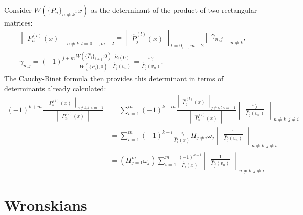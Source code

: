 \documentclass{book}
\begin{document}
Consider $W(\{P_n\}_{n \neq k} ; x)$ as the determinant of the product of two rectangular matrices:
\begin{align*}
\begin{bmatrix} P_n^{(l)}(x) \end{bmatrix}_{n \neq k, l = 0,...,m-2} = 
\begin{bmatrix} \hat{P}_j^{(l)}(x) \end{bmatrix}_{l=0,...,m-2}
\begin{bmatrix} \gamma_{n,j} \end{bmatrix}_{n \neq k}, \\
\gamma_{n,j} = (-1)^{j+m} \frac{ W(\{\hat{P}_i\}_{i \neq j} ; 0) }{ W(\{ \hat{P}_i \} ; 0) } \frac{\hat{P}_j(0)}{\hat{P}_j(v_n)} = \frac{\omega_j}{\hat{P}_j(v_n)} .
\end{align*}
The Cauchy-Binet formula then provides this determinant in terms of determinants already calculated:
\begin{align*}
(-1)^{k+m} \frac{\begin{vmatrix} P_n^{(l)}(x) \end{vmatrix}_{n \neq k, l < m-1}}{\begin{vmatrix} P_n^{(l)}(x) \end{vmatrix} } & = 
\sum_{i=1}^m (-1)^{k+m} \frac{\begin{vmatrix} \hat{P}_j^{(l)}(x) \end{vmatrix}_{j \neq i, l < m-1} }{
\begin{vmatrix} \hat{P}_n^{(l)}(x) \end{vmatrix} }
\begin{vmatrix} \frac{ \omega_j }{ \hat{P}_j(v_n) } \end{vmatrix}_{n \neq k, j \neq i} \\
& = \sum_{i=1}^m (-1)^{k-i} \frac{\omega_i}{\hat{P}_i(x)} \Pi_{j \neq i} \omega_j \begin{vmatrix} \frac{1}{\hat{P}_j(v_n)} \end{vmatrix}_{n \neq k, j \neq i} \\
& = \left ( \Pi_{j=1}^m \omega_j \right ) \sum_{i=1}^m \frac{(-1)^{k-i}}{\hat{P}_i(x)} \begin{vmatrix} \frac{1}{\hat{P}_j(v_n)} \end{vmatrix}_{n \neq k, j \neq i}
\end{align*}

\section{Wronskians}
\end{document}
